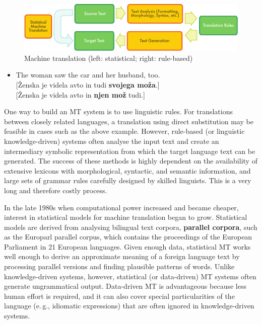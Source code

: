 \begin{multicols}{2}
\begin{figure}[htb]
  \center
  \includegraphics[width=\textwidth]{../_media/english/machine_translation}
  \caption{Machine translation (left: statistical; right: rule-based)}
\label{fig:mtarch_en}
\end{figure}

\begin{itemize}
\item[] The woman saw the car and her husband, too.\\[1mm]
  {[}Ženska je videla avto in tudi \textbf{svojega moža}.{]}\\
  {[}Ženska je videla avto in \textbf{njen mož} tudi.{]}
\end{itemize}

One way to build an MT system is to use linguistic rules. For translations between closely related languages, a translation using direct substitution may be feasible in cases such as the above example. However, rule-based (or linguistic knowledge-driven) systems often analyse the input text and create an intermediary symbolic representation from which the target language text can be generated. The success of these methods is highly dependent on the availability of extensive lexicons with morphological, syntactic, and semantic information, and large sets of grammar rules carefully designed by skilled linguists. This is a very long and therefore costly process.

In the late 1980s when computational power increased and became cheaper, interest in statistical models for machine translation began to grow. Statistical models are derived from analysing bilingual text corpora, \textbf{parallel corpora}, such as the Europarl parallel corpus, which contains the proceedings of the European Parliament in 21 European languages. Given enough data, statistical MT works well enough to derive an approximate meaning of a foreign language text by processing parallel versions and finding plausible patterns of words. Unlike knowledge-driven systems, however, statistical (or data-driven) MT systems often generate ungrammatical output. Data-driven MT is advantageous because less human effort is required, and it can also cover special particularities of the language (e.\,g., idiomatic expressions) that are often ignored in knowledge-driven systems. 


\end{multicols}

